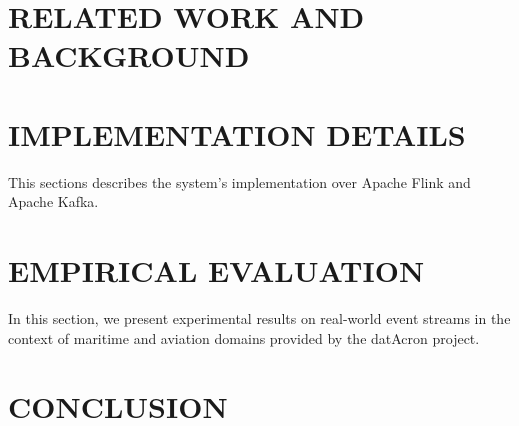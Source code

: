 



\section{RELATED WORK AND BACKGROUND}






 
\section{IMPLEMENTATION DETAILS}
This sections describes the system's implementation over Apache Flink and Apache Kafka.

\section{EMPIRICAL EVALUATION}
In this section, we present experimental results on real-world event streams in the context of maritime and aviation domains provided by the datAcron project.

\section{CONCLUSION}